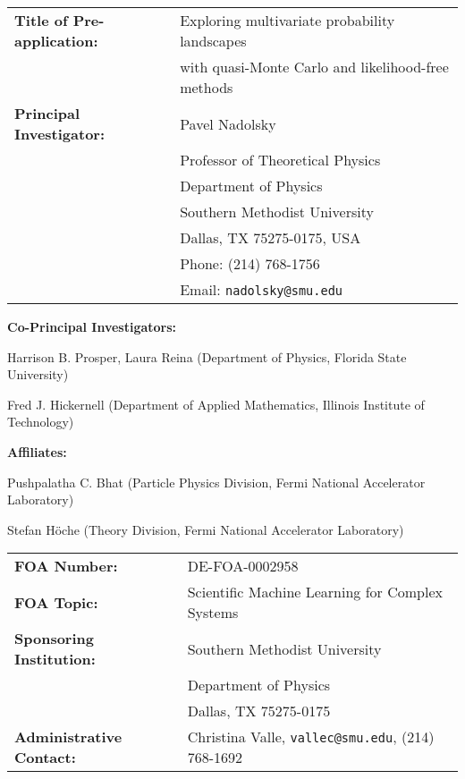 \documentclass[11pt,titlepage,
preprint,
aps,prd,
nofootinbib,
superscriptaddress,
showpacs,
amsmath,
amssymb
]{article}
\begin{document}
\large
\begin{tabular*}{1.5\textwidth}[]{ll}
{\bf Title of Pre-application:} & Exploring multivariate probability landscapes \\ 
& with quasi-Monte Carlo and likelihood-free methods\vspace{6pt} \\
{\bf Principal Investigator: } 
& Pavel Nadolsky \\
& Professor of Theoretical Physics \\
& Department of Physics \\
& Southern Methodist University \\ 
& Dallas, TX 75275-0175, USA      \\
& Phone:  (214) 768-1756 \\
& Email: \texttt{nadolsky@smu.edu} 
\end{tabular*}

\vspace{12pt}
{\bf Co-Principal Investigators:} 
\vspace{3pt}

Harrison B. Prosper, Laura Reina (Department of Physics, Florida State University)

Fred J. Hickernell (Department of Applied Mathematics, Illinois Institute of Technology)

\vspace{12pt}

{\bf Affiliates:}
\vspace{6pt}


Pushpalatha C. Bhat (Particle Physics Division, Fermi National Accelerator Laboratory)

Stefan H\"oche (Theory Division, Fermi National Accelerator Laboratory)

\vspace{12pt}

\begin{tabular}{ll}
{\bf FOA Number:} & DE-FOA-0002958 \vspace{6pt} \\
{\bf FOA Topic:} & Scientific Machine Learning for Complex Systems \vspace{12pt} \\
{\bf Sponsoring Institution:} & Southern Methodist University \\
& Department of Physics \\
& Dallas, TX 75275-0175 \vspace{6pt} \\
{\bf Administrative Contact:} & Christina Valle, 
\texttt{vallec@smu.edu}, (214) 768-1692
\end{tabular}
\end{document}
